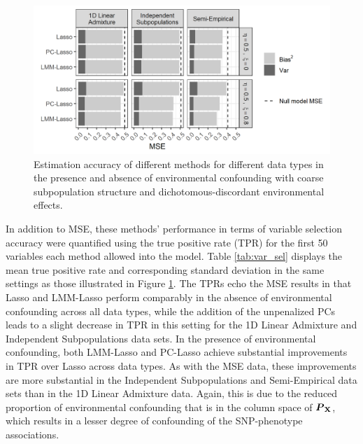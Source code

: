 \begin{figure}[H]
    \centering
    \includegraphics[scale = 1.1]{figures/beta_mse.png}
    \caption{Estimation accuracy of different methods for different data types in the presence and absence of environmental confounding with coarse subpopulation structure and dichotomous-discordant environmental effects.}
    \label{fig:mse}
\end{figure}
In addition to MSE, these methods' performance in terms of variable selection accuracy were quantified using the true positive rate (TPR) for the first 50 variables each method allowed into the model. Table \ref{tab:var_sel} displays the mean true positive rate and corresponding standard deviation in the same settings as those illustrated in Figure \ref{fig:mse}. The TPRs echo the MSE results in that Lasso and LMM-Lasso perform comparably in the absence of environmental confounding across all data types, while the addition of the unpenalized PCs leads to a slight decrease in TPR in this setting for the 1D Linear Admixture and Independent Subpopulations data sets. In the presence of environmental confounding, both LMM-Lasso and PC-Lasso achieve substantial improvements in TPR over Lasso across data types. As with the MSE data, these improvements are more substantial in the Independent Subpopulations and Semi-Empirical data sets than in the 1D Linear Admixture data. Again, this is due to the reduced proportion of environmental confounding that is in the column space of $\boldsymbol{P}_{\textbf{X}}$, which results in a lesser degree of confounding of the SNP-phenotype associations.

